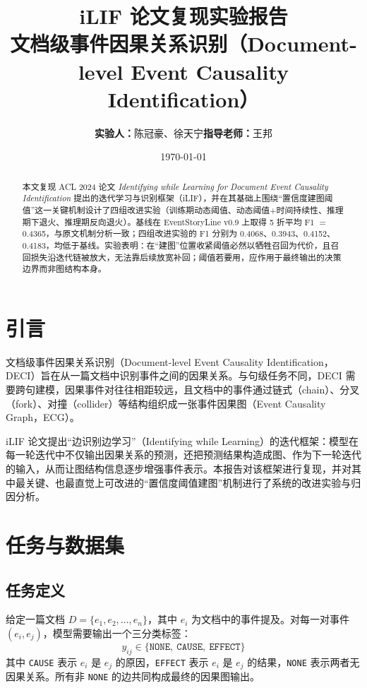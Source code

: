 \documentclass[11pt,a4paper]{ctexart}
\title{\bfseries iLIF 论文复现实验报告\\[0.3em]
\large 文档级事件因果关系识别（Document-level Event Causality Identification）}
\author{\textbf{实验人：}陈冠豪、徐天宁\qquad\textbf{指导老师：}王邦}
\date{\today}
\begin{document}
\maketitle
\vspace{-2em}

\begin{abstract}
本文复现 ACL 2024 论文 \emph{Identifying while Learning for Document Event Causality Identification} 提出的迭代学习与识别框架（iLIF），并在其基础上围绕``置信度建图阈值''这一关键机制设计了四组改进实验（训练期动态阈值、动态阈值+时间持续性、推理期下退火、推理期反向退火）。基线在 EventStoryLine v0.9 上取得 5 折平均 F1 $=$ 0.4365，与原文机制分析一致；四组改进实验的 F1 分别为 0.4068、0.3943、0.4152、0.4183，均低于基线。实验表明：在``建图''位置收紧阈值必然以牺牲召回为代价，且召回损失沿迭代链被放大，无法靠后续放宽补回；阈值若要用，应作用于最终输出的决策边界而非图结构本身。
\end{abstract}

\tableofcontents

\section{引言}

文档级事件因果关系识别（Document-level Event Causality Identification，DECI）旨在从一篇文档中识别事件之间的因果关系。与句级任务不同，DECI 需要跨句建模，因果事件对往往相距较远，且文档中的事件通过链式（chain）、分叉（fork）、对撞（collider）等结构组织成一张事件因果图（Event Causality Graph，ECG）。

iLIF 论文提出``边识别边学习''（Identifying while Learning）的迭代框架：模型在每一轮迭代中不仅输出因果关系的预测，还把预测结果构造成图、作为下一轮迭代的输入，从而让图结构信息逐步增强事件表示。本报告对该框架进行复现，并对其中最关键、也最直觉上可改进的``置信度阈值建图''机制进行了系统的改进实验与归因分析。

\section{任务与数据集}

\subsection{任务定义}

给定一篇文档 $D=\{e_1, e_2, \dots, e_n\}$，其中 $e_i$ 为文档中的事件提及。对每一对事件 $(e_i, e_j)$，模型需要输出一个三分类标签：
\begin{equation}
y_{ij} \in \{\texttt{NONE},\ \texttt{CAUSE},\ \texttt{EFFECT}\}
\end{equation}
其中 \texttt{CAUSE} 表示 $e_i$ 是 $e_j$ 的原因，\texttt{EFFECT} 表示 $e_i$ 是 $e_j$ 的结果，\texttt{NONE} 表示两者无因果关系。所有非 \texttt{NONE} 的边共同构成最终的因果图输出。
\end{document}
